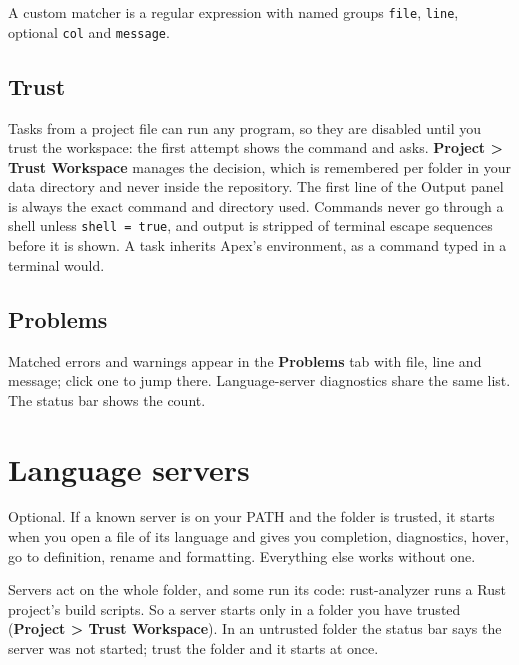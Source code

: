 \documentclass[11pt,a4paper,oneside]{report}
\newcommand{\menu}[1]{\textbf{#1}}
\begin{document}
A custom matcher is a regular expression with named groups \texttt{file},
\texttt{line}, optional \texttt{col} and \texttt{message}.

\section{Trust}

\begin{safenote}
Tasks from a project file can run any program, so they are disabled until
you trust the workspace: the first attempt shows the command and asks.
\menu{Project > Trust Workspace} manages the decision, which is remembered
per folder in your data directory and never inside the repository. The
first line of the Output panel is always the exact command and directory
used. Commands never go through a shell unless \texttt{shell = true}, and
output is stripped of terminal escape sequences before it is shown. A task
inherits Apex's environment, as a command typed in a terminal would.
\end{safenote}

\section{Problems}

Matched errors and warnings appear in the \menu{Problems} tab with file,
line and message; click one to jump there. Language-server diagnostics
share the same list. The status bar shows the count.

\chapter{Language servers}

\begin{nutshell}
Optional. If a known server is on your PATH and the folder is trusted, it
starts when you open a file of its language and gives you completion,
diagnostics, hover, go to definition, rename and formatting. Everything
else works without one.
\end{nutshell}

\begin{safenote}
Servers act on the whole folder, and some run its code: rust-analyzer runs
a Rust project's build scripts. So a server starts only in a folder you
have trusted (\menu{Project > Trust Workspace}). In an untrusted folder the
status bar says the server was not started; trust the folder and it
starts at once.
\end{safenote}
\end{document}
